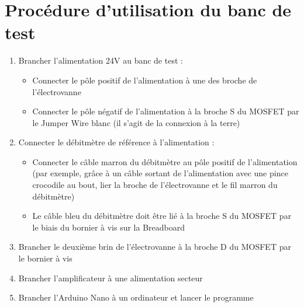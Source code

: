 \section{Procédure d'utilisation du banc de test}
\begin{enumerate}
    \item Brancher l'alimentation 24V au banc de test :
          \begin{itemize}
              \item Connecter le pôle positif de l'alimentation à une des broche de l'électrovanne
              \item Connecter le pôle négatif de l'alimentation à la broche S du MOSFET par le Jumper Wire blanc (il s'agit de la connexion à la terre)
          \end{itemize}

    \item Connecter le débitmètre de référence à l'alimentation :
          \begin{itemize}
              \item Connecter le câble marron du débitmètre au pôle positif de l'alimentation (par exemple, grâce à un câble sortant de l'alimentation
                    avec une pince crocodile au bout, lier la broche de l'électrovanne et le fil marron du débitmètre)
              \item Le câble bleu du débitmètre doit être lié à la broche S du MOSFET par le biais du bornier à vis sur la Breadboard
          \end{itemize}


    \item Brancher le deuxième brin de l'électrovanne à la broche D du MOSFET par le bornier à vis\\

    \item Brancher l'amplificateur à une alimentation secteur\\

    \item Brancher l'Arduino Nano à un ordinateur et lancer le programme\\


\end{enumerate}
